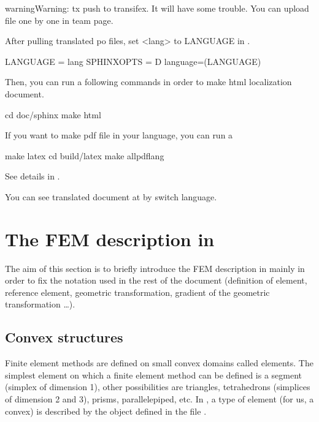 \documentclass[a4paper,11pt,english]{sphinxmanual}
\begin{document}
\begin{sphinxadmonition}{warning}{Warning:}
 tx push to transifex. It will have some trouble. You can upload file one by one in team page.
\end{sphinxadmonition}

After pulling translated po files, set \textless{}lang\textgreater{} to LANGUAGE in  .

\begin{sphinxVerbatim}[commandchars=\\\{\}]
LANGUAGE      = \PYGZlt{}lang\PYGZgt{}
SPHINXOPTS    = \PYGZhy{}D language=\PYGZdl{}(LANGUAGE)
\end{sphinxVerbatim}

Then, you can run a following commands in order to make html localization document.

\begin{sphinxVerbatim}[commandchars=\\\{\}]
cd doc/sphinx
make html
\end{sphinxVerbatim}

If you want to make pdf file in your language, you can run a

\begin{sphinxVerbatim}[commandchars=\\\{\}]
make latex
cd build/latex
make all\PYGZhy{}pdf\PYGZhy{}\PYGZlt{}lang\PYGZgt{}
\end{sphinxVerbatim}

See details in  .

You can see translated document at  by switch language.


\chapter{The FEM description in }
\label{\detokenize{project/femdesc:the-fem-description-in-gf}}\label{\detokenize{project/femdesc:dp-femdesc}}\label{\detokenize{project/femdesc::doc}}
The aim of this section is to briefly introduce the FEM description in 
mainly in order to fix the notation used in the rest of the document (definition
of element, reference element, geometric transformation, gradient of the
geometric transformation …).


\section{Convex structures}
\label{\detokenize{project/femdesc:convex-structures}}
Finite element methods are defined on small convex domains called elements. The
simplest element on which a finite element method can be defined is a segment
(simplex of dimension 1), other possibilities are triangles, tetrahedrons
(simplices of dimension 2 and 3), prisms, parallelepiped, etc. In , a type of
element (for us, a convex) is described by the object  defined in the file
.
\end{document}
